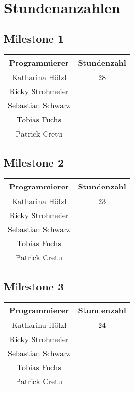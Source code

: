 \chapter{Stundenanzahlen}
\section{Milestone 1}
\begin{center}
	\begin{tabular}{|c|c|}
		\hline \textbf{Programmierer} & \textbf{Stundenzahl} \\ 
		\hline Katharina Hölzl  & 28 \\ 
		\hline Ricky Strohmeier &  \\ 
		\hline Sebastian Schwarz &  \\ 
		\hline Tobias Fuchs &  \\ 
		\hline Patrick Cretu &  \\ 
		\hline 
	\end{tabular}
\end{center} 
\section{Milestone 2}
\begin{center}
	\begin{tabular}{|c|c|}
		\hline \textbf{Programmierer} & \textbf{Stundenzahl} \\ 
		\hline Katharina Hölzl  & 23  \\ 
		\hline Ricky Strohmeier &  \\ 
		\hline Sebastian Schwarz &  \\ 
		\hline Tobias Fuchs &  \\ 
		\hline Patrick Cretu &  \\ 
		\hline 
	\end{tabular}
\end{center} 
\section{Milestone 3}
\begin{center}
	\begin{tabular}{|c|c|}
		\hline \textbf{Programmierer} & \textbf{Stundenzahl} \\ 
		\hline Katharina Hölzl  & 24 \\ 
		\hline Ricky Strohmeier &  \\ 
		\hline Sebastian Schwarz &  \\ 
		\hline Tobias Fuchs &  \\ 
		\hline Patrick Cretu &  \\ 
		\hline 
	\end{tabular}
\end{center} 

